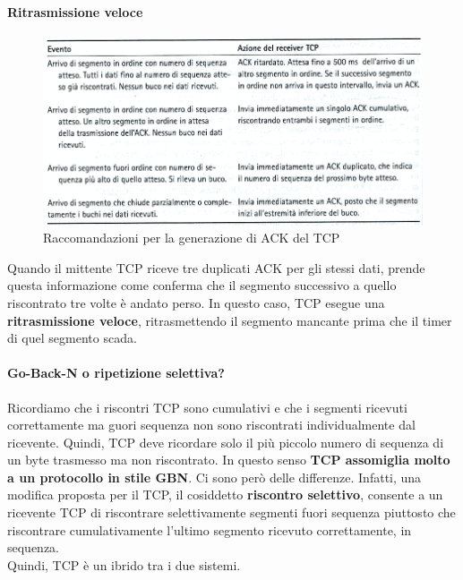 \documentclass[11pt,a4paper]{article}
\begin{document}
\paragraph{Ritrasmissione veloce}
\begin{figure}
	\includegraphics[scale=0.6]{img/034.png}
	\caption{Raccomandazioni per la generazione di ACK del TCP}
\end{figure}
Quando il mittente TCP riceve tre duplicati ACK per gli stessi dati, prende questa informazione come conferma che il segmento successivo a quello riscontrato tre volte è andato perso. In questo caso, TCP esegue una \textbf{ritrasmissione veloce}, ritrasmettendo il segmento mancante prima che il timer di quel segmento scada.
\paragraph{Go-Back-N o ripetizione selettiva?}
Ricordiamo che i riscontri TCP sono cumulativi e che i segmenti ricevuti correttamente ma guori sequenza non sono riscontrati individualmente dal ricevente. Quindi, TCP deve ricordare solo il più piccolo numero di sequenza di un byte trasmesso ma non riscontrato. In questo senso \textbf{TCP assomiglia molto a un protocollo in stile GBN}. Ci sono però delle differenze. Infatti, una modifica proposta per il TCP, il cosiddetto \textbf{riscontro selettivo}, consente a un ricevente TCP di riscontrare selettivamente segmenti fuori sequenza piuttosto che riscontrare cumulativamente l'ultimo segmento ricevuto correttamente, in sequenza. \\
Quindi, TCP è un ibrido tra i due sistemi.
\end{document}
